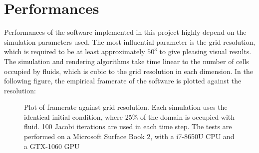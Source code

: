 \section{Performances}

Performances of the software implemented in this project highly depend on the simulation parameters used. The most influential parameter is the grid resolution, which is required to be at least approximately $50^3$ to give pleasing visual results. The simulation and rendering algorithms take time linear to the number of cells occupied by fluids, which is cubic to the grid resolution in each dimension. In the following figure, the empirical framerate of the software is plotted against the resolution:

\begin{figure}[H]
    \centering

    
    \caption{Plot of framerate against grid resolution. Each simulation uses the identical initial condition, where 25\% of the domain is occupied with fluid. 100 Jacobi iterations are used in each time step. The tests are performed on a Microsoft Surface Book 2, with a i7-8650U CPU and a GTX-1060 GPU}
    \label{fig FPS vs grid res}
\end{figure}


